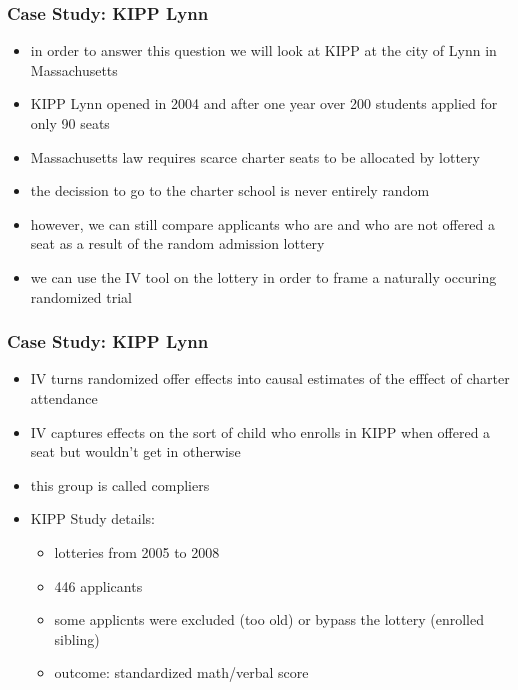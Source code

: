 \documentclass{beamer}
\begin{document}
\begin{frame}
\frametitle{Case Study: KIPP Lynn}
\begin{itemize}
\item in order to answer this question we will look at KIPP at the city of Lynn in Massachusetts
\item KIPP Lynn opened in 2004 and after one year over 200 students applied for only 90 seats
\item Massachusetts law requires scarce charter seats to be allocated by lottery
\item the decission to go to the charter school is never entirely random 
\item however, we can still compare applicants who are and who are not offered a seat as a result of the random admission lottery
\item we can use the IV tool on the lottery in order to frame a naturally occuring randomized trial
\end{itemize}

\end{frame}
\begin{frame}
\frametitle{Case Study: KIPP Lynn}
\begin{itemize}
\item IV turns randomized offer effects into causal estimates of the efffect of charter attendance
\item IV captures effects on the sort of child who enrolls in KIPP when offered a seat but wouldn't get in otherwise
\item this group is called compliers 
\item KIPP Study details:
	\begin{itemize}
		\item lotteries from 2005 to 2008
		\item 446 applicants
		\item some applicnts were excluded (too old) or bypass the lottery (enrolled sibling)
		\item outcome: standardized math/verbal score
	\end{itemize}
\end{itemize}

\end{frame}
\end{document}
